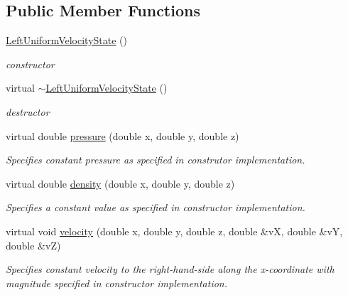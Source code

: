 \subsection*{Public Member Functions}
\begin{DoxyCompactItemize}
\item 
\hypertarget{classLeftUniformVelocityState_a8d8468781815d8f842537b8b69412f73}{\hyperlink{classLeftUniformVelocityState_a8d8468781815d8f842537b8b69412f73}{Left\-Uniform\-Velocity\-State} ()}\label{classLeftUniformVelocityState_a8d8468781815d8f842537b8b69412f73}

\begin{DoxyCompactList}\small\item\em constructor \end{DoxyCompactList}\item 
\hypertarget{classLeftUniformVelocityState_a3df71d7b95da2f4a889e24e9158eaab9}{virtual \hyperlink{classLeftUniformVelocityState_a3df71d7b95da2f4a889e24e9158eaab9}{$\sim$\-Left\-Uniform\-Velocity\-State} ()}\label{classLeftUniformVelocityState_a3df71d7b95da2f4a889e24e9158eaab9}

\begin{DoxyCompactList}\small\item\em destructor \end{DoxyCompactList}\item 
virtual double \hyperlink{classLeftUniformVelocityState_a68e1d653f1a188e911a59bb888c08cb5}{pressure} (double x, double y, double z)
\begin{DoxyCompactList}\small\item\em Specifies constant pressure as specified in construtor implementation. \end{DoxyCompactList}\item 
virtual double \hyperlink{classLeftUniformVelocityState_a9622dfb041401cb5b62e3d0e326073b0}{density} (double x, double y, double z)
\begin{DoxyCompactList}\small\item\em Specifies a constant value as specified in constructor implementation. \end{DoxyCompactList}\item 
virtual void \hyperlink{classLeftUniformVelocityState_a4495d2ca9f4d8f480e504d399b45b6f8}{velocity} (double x, double y, double z, double \&v\-X, double \&v\-Y, double \&v\-Z)
\begin{DoxyCompactList}\small\item\em Specifies constant velocity to the right-\/hand-\/side along the x-\/coordinate with magnitude specified in constructor implementation. \end{DoxyCompactList}\end{DoxyCompactItemize}


